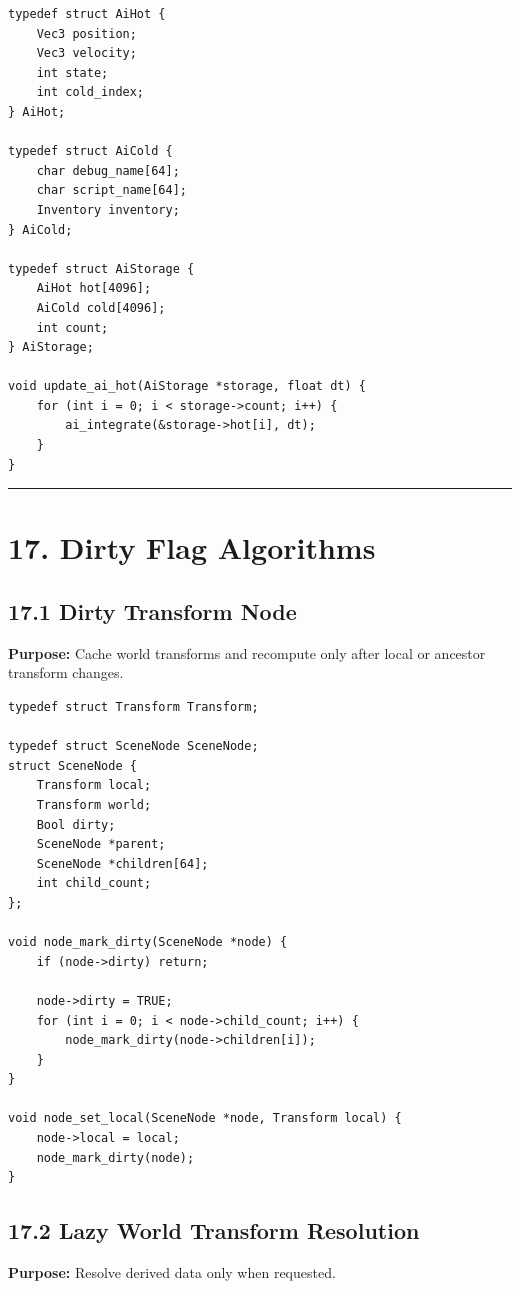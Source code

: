 \documentclass[10pt,letterpaper]{article}
\begin{document}
\begin{verbatim}
typedef struct AiHot {
    Vec3 position;
    Vec3 velocity;
    int state;
    int cold_index;
} AiHot;

typedef struct AiCold {
    char debug_name[64];
    char script_name[64];
    Inventory inventory;
} AiCold;

typedef struct AiStorage {
    AiHot hot[4096];
    AiCold cold[4096];
    int count;
} AiStorage;

void update_ai_hot(AiStorage *storage, float dt) {
    for (int i = 0; i < storage->count; i++) {
        ai_integrate(&storage->hot[i], dt);
    }
}
\end{verbatim}

\medskip\hrule\medskip

\clearpage
\section{17. Dirty Flag Algorithms}

\subsection{17.1 Dirty Transform Node}

\textbf{Purpose:} Cache world transforms and recompute only after local or ancestor transform changes.

\begin{verbatim}
typedef struct Transform Transform;

typedef struct SceneNode SceneNode;
struct SceneNode {
    Transform local;
    Transform world;
    Bool dirty;
    SceneNode *parent;
    SceneNode *children[64];
    int child_count;
};

void node_mark_dirty(SceneNode *node) {
    if (node->dirty) return;

    node->dirty = TRUE;
    for (int i = 0; i < node->child_count; i++) {
        node_mark_dirty(node->children[i]);
    }
}

void node_set_local(SceneNode *node, Transform local) {
    node->local = local;
    node_mark_dirty(node);
}
\end{verbatim}

\subsection{17.2 Lazy World Transform Resolution}

\textbf{Purpose:} Resolve derived data only when requested.
\end{document}
